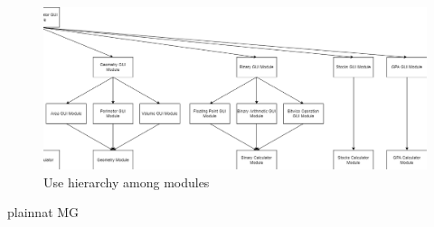 \documentclass[12pt, titlepage]{article}
\begin{document}
\begin{figure}[H]
\centering
\includegraphics[scale=0.7, angle=270]{UsesHierarchy2.png}
\caption{Use hierarchy among modules}
\label{FigUH}
\end{figure}


 {plainnat}
 {MG}
\end{document}
